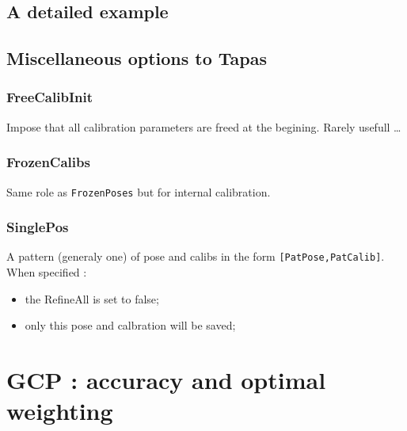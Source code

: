 




\subsection{A detailed example}

\subsection{Miscellaneous options to Tapas}

\subsubsection{FreeCalibInit}

Impose that all calibration parameters are freed at the begining. Rarely usefull \dots 

\subsubsection{FrozenCalibs}

Same role as {\tt FrozenPoses} but for internal calibration.



\subsubsection{SinglePos}

A pattern (generaly one) of pose and calibs in the form {\tt [PatPose,PatCalib]}. When specified :

\begin{itemize}
   \item the RefineAll is set to false;
   \item only this pose and calbration will be saved;
\end{itemize}



\section{GCP : accuracy and optimal weighting}

